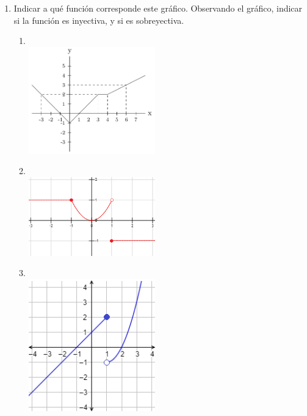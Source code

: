 \documentclass[a4paper]{article}
\newcommand{\exercise}{\item}
\begin{document}
\begin{enumerate}
\begin{multicols}{2}
\begin{enumerate} [label=(\alph*)]
		\item $\left\{\begin{matrix}\hspace{-2mm}3x-2 ~~~ si ~~x\leq 2 ~~\\ \hspace{-2mm} ~~~~~ x^2 ~~~~~~  si ~~2<x\leq 3 \\ \hspace{-2mm}\displaystyle{\frac{x+6}{9}} ~~~ si ~~x>3 ~~\end{matrix}\right.$
		\item $\left\{\begin{matrix}x^2+7 ~~~~ si ~~x\leq 2\\ x+4 ~~~~~ si ~~x>2\end{matrix}\right.$
	\end{enumerate}
	\end{multicols}
	\newpage
	\exercise Indicar a qué función corresponde este gráfico. Observando el gráfico, indicar si la función es inyectiva, y si es sobreyectiva.
	\begin{multicols}{2}
	\begin{enumerate} [label=(\alph*)]
		\item ~\\ [-12pt] \includegraphics[width=55mm]{img/func1.png} \vfill
		\item ~\\ [-12pt] \includegraphics[width=55mm]{img/func2.png} \vfill
		\item ~\\ [-12pt] \includegraphics[width=55mm]{img/func3.png} \vfill

\end{enumerate}
\end{multicols}
\end{enumerate}
\end{document}
